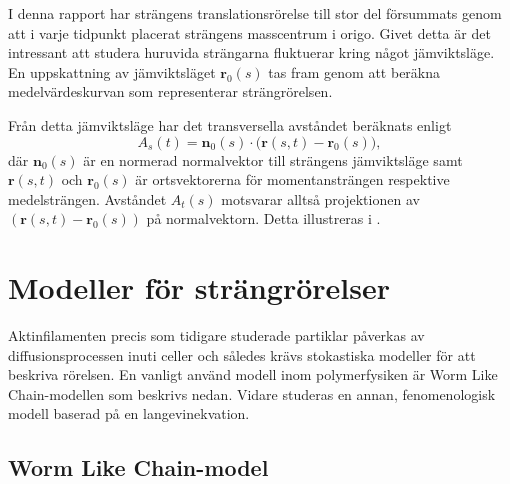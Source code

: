 I denna rapport har strängens translationsrörelse till stor del försummats genom att i varje tidpunkt placerat strängens masscentrum i origo. Givet detta är det intressant att studera huruvida strängarna fluktuerar kring något jämviktsläge. En uppskattning av jämviktsläget $\mathbf{r}_0(s)$ tas fram genom att beräkna medelvärdeskurvan som representerar strängrörelsen. 

Från detta jämviktsläge har det transversella avståndet beräknats enligt 
\begin{equation}
A_s(t) = \mathbf{n}_0(s)\cdot\Big(\mathbf{r}(s,t)-\mathbf{r}_0(s)\Big),
\end{equation}
där $\mathbf{n}_0(s)$ är en normerad normalvektor till strängens jämviktsläge samt $\mathbf{r}(s,t)$ och $\mathbf{r}_0(s)$ är ortsvektorerna för momentansträngen respektive medelsträngen. Avståndet $A_t(s)$ motsvarar alltså projektionen av $(\mathbf{r}(s,t)-\mathbf{r}_0(s))$ på normalvektorn. Detta 
illustreras i .








\section{Modeller för strängrörelser}

Aktinfilamenten precis som tidigare studerade partiklar påverkas av diffusionsprocessen inuti celler och således krävs stokastiska modeller för att beskriva rörelsen. En vanligt använd modell inom polymerfysiken är Worm Like Chain-modellen som beskrivs nedan. Vidare studeras en annan, fenomenologisk modell baserad på en langevinekvation. 



\subsection{Worm Like Chain-model}

